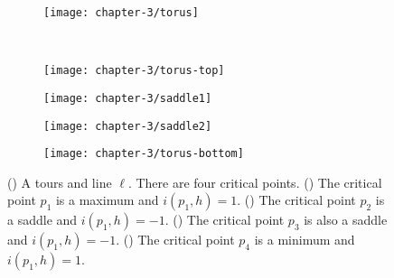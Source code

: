  \begin{figure}[htb]
         \centering
        \begin{subfigure}[b]{0.3\textwidth}
         \texttt{[image: chapter-3/torus]}
 	 \label{fig:torus-ell}
       \end{subfigure}\\
         \begin{subfigure}[b]{0.21\textwidth}
         \texttt{[image: chapter-3/torus-top]}
          \label{fig:max}
         \end{subfigure}
          \begin{subfigure}[b]{0.21\textwidth}
         \texttt{[image: chapter-3/saddle1]}
          \label{fig:saddle1}
         \end{subfigure}
         \begin{subfigure}[b]{0.21\textwidth}
         \texttt{[image: chapter-3/saddle2]}
          \label{fig:saddle2}
         \end{subfigure}
         \begin{subfigure}[b]{0.21\textwidth}
         \texttt{[image: chapter-3/torus-bottom]}
         \label{fig:min}
         \end{subfigure}
		\caption{() A tours and line $\ell$. There are four critical points.
 		() The critical point $p_1$ is a maximum and $i(p_1,h)=1$.
		() The critical point $p_2$ is a saddle and $i(p_1,h)=-1$.
		() The critical point $p_3$ is also a saddle and $i(p_1,h)=-1$.
		() The critical point $p_4$ is a minimum and $i(p_1,h)=1$.
 		\label{fig:torus-total}}
 \end{figure}








